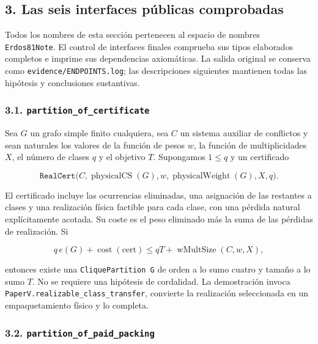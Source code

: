 \documentclass[spanish,11pt,a4paper]{article}
\begin{document}
\subsection{3. Las seis interfaces públicas
comprobadas}\label{las-seis-interfaces-puxfablicas-comprobadas}

Todos los nombres de esta sección pertenecen al espacio de nombres
\nolinkurl{Erdos81Note}. El control de interfaces finales comprueba sus
tipos elaborados completos e imprime sus dependencias axiomáticas. La
salida original se conserva como \nolinkurl{evidence/ENDPOINTS.log}; las
descripciones siguientes mantienen todas las hipótesis y conclusiones
sustantivas.

\subsubsection{\texorpdfstring{3.1.
\nolinkurl{partition_of_certificate}}{3.1. partition\_of\_certificate}}\label{partition_of_certificate}

Sea \(G\) un grafo simple finito cualquiera, sea \(C\) un sistema
auxiliar de conflictos y sean naturales los valores de la función de
pesos \(w\), la función de multiplicidades \(X\), el número de clases
\(q\) y el objetivo \(T\). Supongamos \(1\le q\) y un certificado

\[
\texttt{RealCert}\bigl(C,\operatorname{physicalCS}(G),
w,\operatorname{physicalWeight}(G),X,q\bigr).
\]

El certificado incluye las ocurrencias eliminadas, una asignación de las
restantes a clases y una realización física factible para cada clase,
con una pérdida natural explícitamente acotada. Su coste es el peso
eliminado más la suma de las pérdidas de realización. Si

\[
q\,e(G)+\operatorname{cost}(\mathrm{cert})
\le qT+\operatorname{wMultSize}(C,w,X),
\]

entonces existe una \texttt{CliquePartition\ G} de orden a lo sumo
cuatro y tamaño a lo sumo \(T\). No se requiere una hipótesis de
cordalidad. La demostración invoca
\nolinkurl{PaperV.realizable_class_transfer}, convierte la realización
seleccionada en un empaquetamiento físico y lo completa.

\subsubsection{\texorpdfstring{3.2.
\nolinkurl{partition_of_paid_packing}}{3.2. partition\_of\_paid\_packing}}\label{partition_of_paid_packing}
\end{document}

